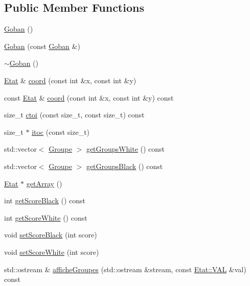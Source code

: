 \subsection*{Public Member Functions}
\begin{DoxyCompactItemize}
\item 
\hyperlink{class_goban_a3544d30f54fbb54bd9e4fed08aa4bce6}{Goban} ()
\item 
\hyperlink{class_goban_a8c49da36e406f11d33671a4c8a4c19b2}{Goban} (const \hyperlink{class_goban}{Goban} \&)
\item 
\hyperlink{class_goban_a5b994de02310a29128749d8ea47ea0ab}{$\sim$\+Goban} ()
\item 
\hyperlink{class_etat}{Etat} \& \hyperlink{class_goban_a29aaf8df380fe614845d48cba057747c}{coord} (const int \&x, const int \&y)
\item 
const \hyperlink{class_etat}{Etat} \& \hyperlink{class_goban_ac674775d4101d921257acc21cfec935c}{coord} (const int \&x, const int \&y) const
\item 
size\+\_\+t \hyperlink{class_goban_a579840586df08a58983f6b497979344b}{ctoi} (const size\+\_\+t, const size\+\_\+t) const
\item 
size\+\_\+t $\ast$ \hyperlink{class_goban_aa2aaa3b4db4549d169bd0ff234d601cb}{itoc} (const size\+\_\+t)
\item 
std\+::vector$<$ \hyperlink{class_groupe}{Groupe} $>$ \hyperlink{class_goban_a0d5ecea357ff85e7d08f2c0855d83e6b}{get\+Groups\+White} () const
\item 
std\+::vector$<$ \hyperlink{class_groupe}{Groupe} $>$ \hyperlink{class_goban_a0a8ed1098b25c0c42cb5faadaa0605d4}{get\+Groups\+Black} () const
\item 
\hyperlink{class_etat}{Etat} $\ast$ \hyperlink{class_goban_a6b13aeeebc07fddc6a0e4557b90adc7d}{get\+Array} ()
\item 
int \hyperlink{class_goban_aa8e21b5f8d033ce312c8001e3483efa4}{get\+Score\+Black} () const
\item 
int \hyperlink{class_goban_a424e710954cc8fda4baa1ebdb02a5441}{get\+Score\+White} () const
\item 
void \hyperlink{class_goban_a868b44b0c3ebec7ca88082ebe85a2960}{set\+Score\+Black} (int score)
\item 
void \hyperlink{class_goban_a1d3ccccfb3f539e0271ee321686d9ef4}{set\+Score\+White} (int score)
\item 
std\+::ostream \& \hyperlink{class_goban_aefd43ab2cf0746f2f8c653d825bf080c}{affiche\+Groupes} (std\+::ostream \&stream, const \hyperlink{class_etat_af3ddb2296ffc379b7f3ad2bf832f294e}{Etat\+::\+V\+AL} \&val) const

\end{DoxyCompactItemize}
